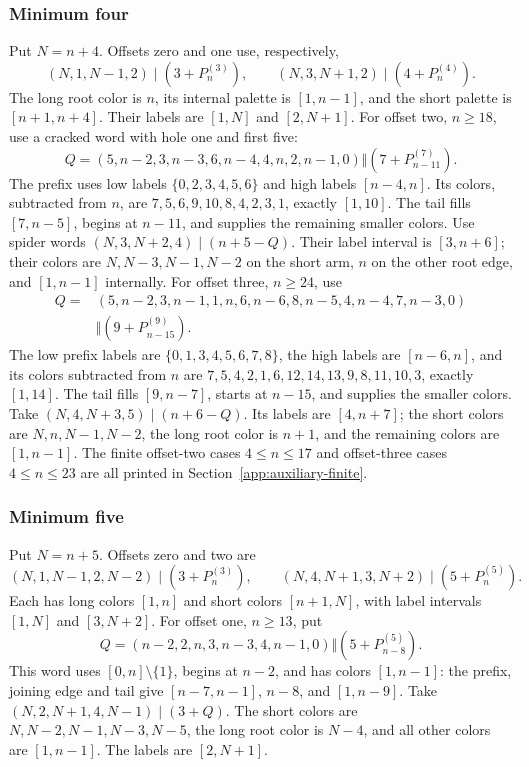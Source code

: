 \subsubsection{Minimum four}
Put $N=n+4$. Offsets zero and one use, respectively,
\[
(N,1,N-1,2)\mid(3+P_n^{(3)}),\qquad
(N,3,N+1,2)\mid(4+P_n^{(4)}).
\]
The long root color is $n$, its internal palette is $[1,n-1]$, and the short palette is $[n+1,n+4]$. Their labels are $[1,N]$ and $[2,N+1]$.
For offset two, $n\ge18$, use a cracked word with hole one and first five:
\[
Q=(5,n-2,3,n-3,6,n-4,4,n,2,n-1,0)
\Vert(7+P_{n-11}^{(7)}).
\]
The prefix uses low labels $\{0,2,3,4,5,6\}$ and high labels $[n-4,n]$. Its colors, subtracted from $n$, are $7,5,6,9,10,8,4,2,3,1$, exactly $[1,10]$. The tail fills $[7,n-5]$, begins at $n-11$, and supplies the remaining smaller colors. Use spider words $(N,3,N+2,4)\mid(n+5-Q)$. Their label interval is $[3,n+6]$; their colors are $N,N-3,N-1,N-2$ on the short arm, $n$ on the other root edge, and $[1,n-1]$ internally.
For offset three, $n\ge24$, use
\[
\begin{split}
Q={}&(5,n-2,3,n-1,1,n,6,n-6,8,n-5,4,n-4,7,n-3,0)\\
&\Vert(9+P_{n-15}^{(9)}).
\end{split}
\]
The low prefix labels are $\{0,1,3,4,5,6,7,8\}$, the high labels are $[n-6,n]$, and its colors subtracted from $n$ are
$7,5,4,2,1,6,12,14,13,9,8,11,10,3$, exactly $[1,14]$. The tail fills $[9,n-7]$, starts at $n-15$, and supplies the smaller colors. Take $(N,4,N+3,5)\mid(n+6-Q)$. Its labels are $[4,n+7]$; the short colors are $N,n,N-1,N-2$, the long root color is $n+1$, and the remaining colors are $[1,n-1]$. The finite offset-two cases $4\le n\le17$ and offset-three cases $4\le n\le23$ are all printed in Section~\ref{app:auxiliary-finite}.

\subsubsection{Minimum five}
Put $N=n+5$. Offsets zero and two are
\[
(N,1,N-1,2,N-2)\mid(3+P_n^{(3)}),\qquad
(N,4,N+1,3,N+2)\mid(5+P_n^{(5)}).
\]
Each has long colors $[1,n]$ and short colors $[n+1,N]$, with label intervals $[1,N]$ and $[3,N+2]$.
For offset one, $n\ge13$, put
\[
Q=(n-2,2,n,3,n-3,4,n-1,0)\Vert(5+P_{n-8}^{(5)}).
\]
This word uses $[0,n]\setminus\{1\}$, begins at $n-2$, and has colors $[1,n-1]$: the prefix, joining edge and tail give $[n-7,n-1]$, $n-8$, and $[1,n-9]$. Take $(N,2,N+1,4,N-1)\mid(3+Q)$. The short colors are $N,N-2,N-1,N-3,N-5$, the long root color is $N-4$, and all other colors are $[1,n-1]$. The labels are $[2,N+1]$.

